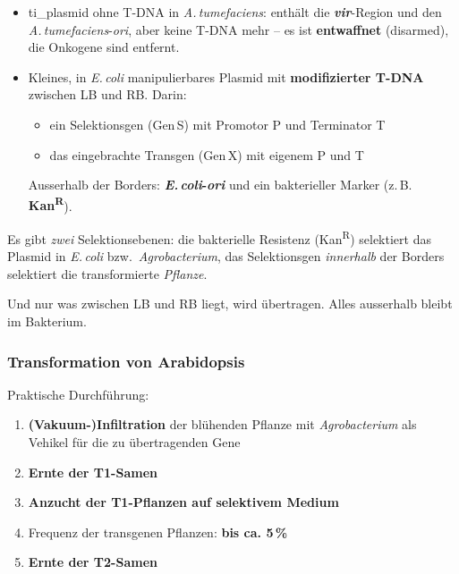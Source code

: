 \begin{itemize}
    \item[Helferplasmid] \gls{ti_plasmid} ohne T-DNA in
    \emph{A.\,tumefaciens}: enthält die \textbf{\emph{vir}}-Region und den
    \emph{A.\,tumefaciens}-\emph{ori}, aber keine T-DNA mehr --
    es ist \textbf{entwaffnet} (disarmed), die Onkogene sind entfernt.
    \item[Binärvektor] Kleines, in \emph{E.\,coli} manipulierbares Plasmid mit
    \textbf{modifizierter T-DNA} zwischen LB und RB. Darin:
    \begin{itemize}
        \item ein Selektionsgen (Gen\,S) mit Promotor P und Terminator T
        \item das eingebrachte Transgen (Gen\,X) mit eigenem
        P und T
    \end{itemize}
    Ausserhalb der Borders: \textbf{\emph{E.\,coli}-\emph{ori}} und ein
    bakterieller Marker (z.\,B. \textbf{Kan\textsuperscript{R}}).
\end{itemize}

\begin{bem}
    Es gibt \emph{zwei}
    Selektionsebenen: die bakterielle Resistenz (Kan\textsuperscript{R}) selektiert
    das Plasmid in \emph{E.\,coli} bzw.\ \emph{Agrobacterium}, das Selektionsgen
    \emph{innerhalb} der Borders selektiert die transformierte \emph{Pflanze}.

    Und nur was zwischen LB und RB liegt, wird übertragen.
    Alles ausserhalb
    bleibt im Bakterium.
\end{bem}

\subsubsection{Transformation von Arabidopsis}

Praktische Durchführung:
\begin{enumerate}
    \item \textbf{(Vakuum-)Infiltration} der blühenden Pflanze mit
    \emph{Agrobacterium} als Vehikel für die zu übertragenden Gene
    \item \textbf{Ernte der T1-Samen}
    \item \textbf{Anzucht der T1-Pflanzen auf selektivem Medium}
    \item Frequenz der transgenen Pflanzen: \textbf{bis ca. 5\,\%}
    \item \textbf{Ernte der T2-Samen}
\end{enumerate}

